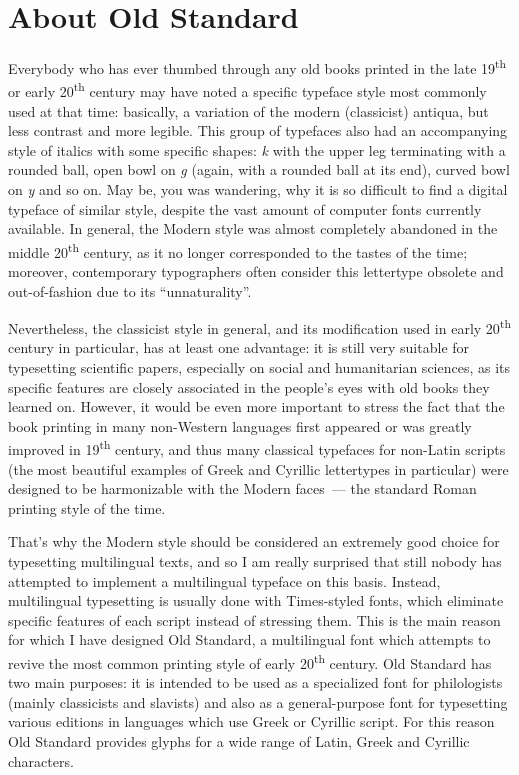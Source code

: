 \documentclass[12pt,a4paper,openany]{book}
\begin{document}
\chapter{About Old Standard}
\thispagestyle{empty}

Everybody who has ever thumbed through any old books printed in the late
19\textsuperscript{th} or early 20\textsuperscript{th} century may have
noted a specific typeface style most commonly used at that time: basically,
a variation of the modern (classicist) antiqua, but less contrast and more
legible. This group of typefaces also had an accompanying style of italics
with some specific shapes: \textit{k} with the upper leg terminating with a
rounded ball, open bowl on \textit{g} (again, with a rounded ball at its end),
curved bowl on \textit{y} and so on. May be, you was wandering, why it is so
difficult to find a digital typeface of similar style, despite the vast
amount of computer fonts currently available. In general, the Modern style
was almost completely abandoned in the middle 20\textsuperscript{th}
century, as it no longer corresponded to the tastes of the time; moreover,
contemporary typographers often consider this lettertype obsolete and
out-of-fashion due to its “unnaturality”.

Nevertheless, the classicist style in general, and its modification used in
early 20\textsuperscript{th} century in particular, has at least one
advantage: it is still very suitable for typesetting scientific papers,
especially on social and humanitarian sciences, as its specific features
are closely associated in the people’s eyes with old books they learned on.
However, it would be even more important to stress the fact that the book
printing in many non-Western languages first appeared or was greatly
improved in 19\textsuperscript{th} century, and thus many classical
typefaces for non-Latin scripts (the most beautiful examples of Greek and
Cyrillic lettertypes in particular) were designed to be harmonizable with
the Modern faces~— the standard Roman printing style of the time.

That’s why the Modern style should be considered an extremely good choice
for typesetting multilingual texts, and so I am really surprised that still
nobody has attempted to implement a multilingual typeface on this basis.
Instead, multilingual typesetting is usually done with Times-styled fonts,
which eliminate specific features of each script instead of stressing them.
This is the main reason for which I have designed Old Standard, a
multilingual font which attempts to revive the most common printing style
of early 20\textsuperscript{th} century. Old Standard has two main
purposes: it is intended to be used as a specialized font for philologists
(mainly classicists and slavists) and also as a general-purpose font for
typesetting various editions in languages which use Greek or Cyrillic
script. For this reason Old Standard provides glyphs for a wide range of
Latin, Greek and Cyrillic characters.
\end{document}
